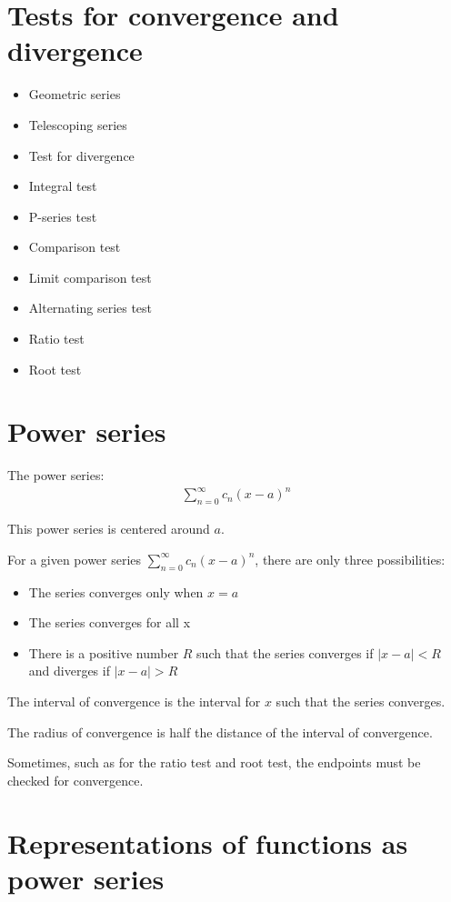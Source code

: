 \documentclass{article}
\begin{document}
\section{Tests for convergence and divergence}

\begin{itemize}
    \item Geometric series
    \item Telescoping series
    \item Test for divergence
    \item Integral test
    \item P-series test
    \item Comparison test
    \item Limit comparison test
    \item Alternating series test
    \item Ratio test
    \item Root test
\end{itemize}

\section{Power series}

The power series:
\begin{gather*}
    \sum_{n=0}^\infty c_n (x - a)^n
\end{gather*}

This power series is centered around $a$.

For a given power series $\sum_{n=0}^\infty c_n (x - a)^n$, there are only three possibilities:
\begin{itemize}
    \item The series converges only when $x=a$
    \item The series converges for all x
    \item There is a positive number $R$ such that the series converges if $|x - a| < R$ and diverges if $|x - a| > R$
\end{itemize}

The interval of convergence is the interval for $x$ such that the series converges.

The radius of convergence is half the distance of the interval of convergence.

Sometimes, such as for the ratio test and root test, the endpoints must be checked for convergence.

\section{Representations of functions as power series}
\end{document}
